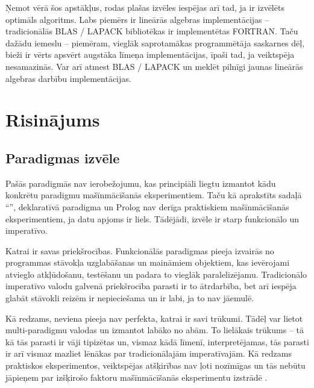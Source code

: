 \documentclass{ludis}
\begin{document}
Ņemot vērā šos apstākļus, rodas plašas izvēles iespējas arī tad, ja ir izvēlēts optimāls algoritms. Labs piemērs ir lineārās algebras implementācijas -- tradicionālās BLAS / LAPACK bibliotēkas ir implementētas FORTRAN. Taču dažādu iemeslu -- piemēram, vieglāk saprotamākas programmētāja saskarnes dēļ, bieži ir vērts apsvērt augstāka līmeņa implementācijas, īpaši tad, ja veiktspēja nesamazinās. Var arī atmest BLAS / LAPACK un meklēt pilnīgi jaunas lineārās algebras darbību implementācijas.

\chapter{Risinājums}
\section{Paradigmas izvēle}
Pašās paradigmās nav ierobežojumu, kas principiāli liegtu izmantot kādu konkrētu paradigmu mašīnmācīšanās eksperimentiem. Taču kā aprakstīts sadaļā ``'', deklaratīvā paradigma un Prolog nav derīga praktiskiem mašīnmācīšanās eksperimentiem, ja datu apjoms ir liels. Tādējādi, izvēle ir starp funkcionālo un imperatīvo.

Katrai ir savas priekšrocības. Funkcionālās paradigmas pieeja izvairās no programmas stāvokļa uzglabāšanas un maināmiem objektiem, kas ievērojami atvieglo atkļūdošanu, testēšanu un padara to vieglāk paralelizējamu. Tradicionālo imperatīvo valodu galvenā priekšrocība parasti ir to ātrdarbība, bet arī iespēja glabāt stāvokli reizēm ir nepieciešama un ir labi, ja to nav jāemulē.

Kā redzams, neviena pieeja nav perfekta, katrai ir savi trūkumi. Tādēļ var lietot multi-paradigmu valodas un izmantot labāko no abām. To lielākais trūkums -- tā kā tās parasti ir vāji tipizētas un, vismaz kādā līmenī, interpretējamas, tās parasti ir arī vismaz mazliet lēnākas par tradicionālajām imperatīvajām. Kā redzams praktiskos eksperimentos, veiktspējas atšķirības nav ļoti nozīmīgas un tās nebūtu jāpieņem par izšķirošo faktoru mašīnmācīšanās eksperimentu izstrādē \cite{bench_game}.


\end{document}
